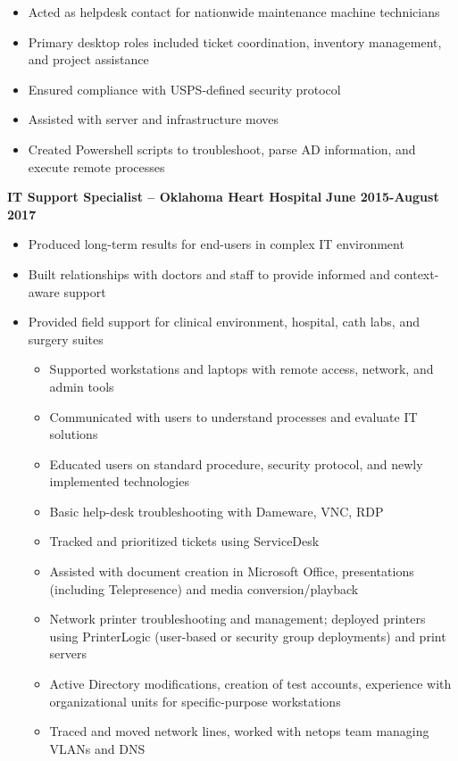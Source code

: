 \documentclass[line]{res}
\begin{document}
\begin{resume}
\begin{itemize}
		\item Acted as helpdesk contact for nationwide maintenance machine technicians
		\item Primary desktop roles included ticket coordination, inventory management, and project assistance
		\item Ensured compliance with USPS-defined security protocol
		\item Assisted with server and infrastructure moves
		\item Created Powershell scripts to troubleshoot, parse AD information, and execute remote processes
	\end{itemize}
\textbf{IT Support Specialist -- Oklahoma Heart Hospital}
\newline
\textbf{June 2015-August 2017}
	\begin{itemize}
		\item Produced long-term results for end-users in complex IT environment
		\item Built relationships with doctors and staff to provide informed and context-aware support
		\item Provided field support for clinical environment, hospital, cath labs, and surgery suites
			\begin{itemize}
				\item Supported workstations and laptops with remote access, network, and admin tools
				\item Communicated with users to understand processes and evaluate IT solutions
				\item Educated users on standard procedure, security protocol, and newly implemented technologies
				\item Basic help-desk troubleshooting with Dameware, VNC, RDP
				\item Tracked and prioritized tickets using ServiceDesk
				\item Assisted with document creation in Microsoft Office, presentations (including Telepresence) and media conversion/playback
				\item Network printer troubleshooting and management; deployed printers using PrinterLogic (user-based or security group deployments) and print servers
				\item Active Directory modifications, creation of test accounts, experience with organizational units for specific-purpose workstations
				\item Traced and moved network lines, worked with netops team managing VLANs and DNS
			\end{itemize}		

\end{itemize}
\end{resume}
\end{document}
